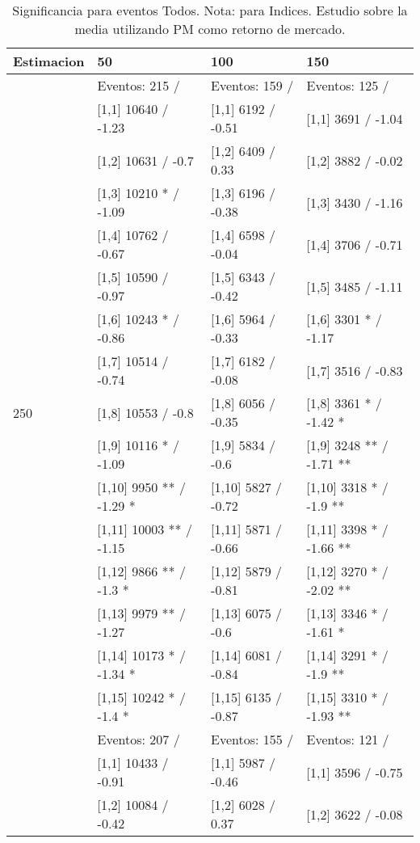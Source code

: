 \begin{table}

\caption{Significancia para eventos Todos. Nota: para Indices. Estudio sobre la media utilizando PM como retorno de mercado.}
\centering
\begin{tabular}[t]{llll}
\toprule
Estimacion & 50 & 100 & 150\\
\midrule
 & Eventos:  215 / & Eventos:  159 / & Eventos:  125 /\\
 & {}[1,1] 10640  / -1.23 & {}[1,1] 6192  / -0.51 & {}[1,1] 3691  / -1.04\\
 & {}[1,2] 10631  / -0.7 & {}[1,2] 6409  / 0.33 & {}[1,2] 3882  / -0.02\\
 & {}[1,3] 10210 * / -1.09 & {}[1,3] 6196  / -0.38 & {}[1,3] 3430  / -1.16\\
 & {}[1,4] 10762  / -0.67 & {}[1,4] 6598  / -0.04 & {}[1,4] 3706  / -0.71\\
\addlinespace
 & {}[1,5] 10590  / -0.97 & {}[1,5] 6343  / -0.42 & {}[1,5] 3485  / -1.11\\
 & {}[1,6] 10243 * / -0.86 & {}[1,6] 5964  / -0.33 & {}[1,6] 3301 * / -1.17\\
 & {}[1,7] 10514  / -0.74 & {}[1,7] 6182  / -0.08 & {}[1,7] 3516  / -0.83\\
250 & {}[1,8] 10553  / -0.8 & {}[1,8] 6056  / -0.35 & {}[1,8] 3361 * / -1.42 *\\
 & {}[1,9] 10116 * / -1.09 & {}[1,9] 5834  / -0.6 & {}[1,9] 3248 ** / -1.71 **\\
\addlinespace
 & {}[1,10] 9950 ** / -1.29 * & {}[1,10] 5827  / -0.72 & {}[1,10] 3318 * / -1.9 **\\
 & {}[1,11] 10003 ** / -1.15 & {}[1,11] 5871  / -0.66 & {}[1,11] 3398 * / -1.66 **\\
 & {}[1,12] 9866 ** / -1.3 * & {}[1,12] 5879  / -0.81 & {}[1,12] 3270 * / -2.02 **\\
 & {}[1,13] 9979 ** / -1.27 & {}[1,13] 6075  / -0.6 & {}[1,13] 3346 * / -1.61 *\\
 & {}[1,14] 10173 * / -1.34 * & {}[1,14] 6081  / -0.84 & {}[1,14] 3291 * / -1.9 **\\
\addlinespace
 & {}[1,15] 10242 * / -1.4 * & {}[1,15] 6135  / -0.87 & {}[1,15] 3310 * / -1.93 **\\
 & Eventos:  207 / & Eventos:  155 / & Eventos:  121 /\\
 & {}[1,1] 10433  / -0.91 & {}[1,1] 5987  / -0.46 & {}[1,1] 3596  / -0.75\\
 & {}[1,2] 10084  / -0.42 & {}[1,2] 6028  / 0.37 & {}[1,2] 3622  / -0.08\\

\end{tabular}
\end{table}
